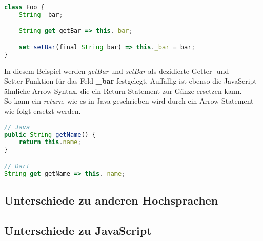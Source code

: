 \begin{lstlisting}[language=JavaScript]
class Foo {
    String _bar;

    String get getBar => this._bar;

    set setBar(final String bar) => this._bar = bar;
}
\end{lstlisting}

In diesem Beispiel werden \textit{getBar} und \textit{setBar} als dezidierte Getter- und\\
Setter-Funktion für das Feld \textbf{\_bar} festgelegt.
Auffällig ist ebenso die JavaScript-ähnliche Arrow-Syntax, die ein Return-Statement
zur Gänze ersetzen kann.\\
So kann ein \textit{return}, wie es in Java geschrieben wird durch ein Arrow-Statement wie folgt
ersetzt werden.

\begin{lstlisting}[language=JavaScript]
// Java
public String getName() {
    return this.name;
}

// Dart
String get getName => this._name;
\end{lstlisting}






    











\subsection{Unterschiede zu anderen Hochsprachen}

\subsection{Unterschiede zu JavaScript}
